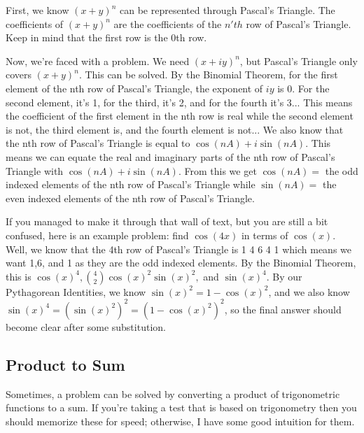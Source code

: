 \documentclass[11pt]{scrartcl}
\begin{document}
\vspace{5mm}
\noindent First, we know $(x+y)^n$ can be represented through Pascal's Triangle. The coefficients of $(x+y)^n$ are the coefficients of the $n'th$ row of Pascal's Triangle. Keep in mind that the first row is the 0th row. 

\vspace{5mm}
\noindent Now, we're faced with a problem. We need $(x+iy)^n$, but Pascal's Triangle only covers $(x+y)^n$. This can be solved. By the Binomial Theorem, for the first element of the nth row of Pascal's Triangle, the exponent of $iy$ is 0. For the second element, it's 1, for the third, it's 2, and for the fourth it's 3... This means the coefficient of the first element in the nth row is real while the second element is not, the third element is, and the fourth element is not... We also know that the nth row of Pascal's Triangle is equal to $\cos(nA)+i\sin(nA)$. This means we can equate the real and imaginary parts of the nth row of Pascal's Triangle with $\cos(nA)+i\sin(nA)$. From this we get $\cos(nA) = $ the odd indexed elements of the nth row of Pascal's Triangle while $\sin(nA) = $ the even indexed elements of the nth row of Pascal's Triangle.

\vspace{5mm}
\noindent If you managed to make it through that wall of text, but you are still a bit confused, here is an example problem: find $\cos(4x)$ in terms of $\cos(x)$. Well, we know that the 4th row of Pascal's Triangle is 1 4 6 4 1 which means we want 1,6, and 1 as they are the odd indexed elements. By the Binomial Theorem, this is $\cos(x)^4, {4\choose2} \cos(x)^2\sin(x)^2,$ and $\sin(x)^4$. By our Pythagorean Identities, we know $\sin(x)^2 = 1-\cos(x)^2$, and we also know $\sin(x)^4=(\sin(x)^2)^2=(1-\cos(x)^2)^2$, so the final answer should become clear after some substitution.

\pagebreak
\subsection{Product to Sum}
\noindent Sometimes, a problem can be solved by converting a product of trigonometric functions to a sum. If you're taking a test that is based on trigonometry then you should memorize these for speed; otherwise, I have some good intuition for them. 

\end{document}
